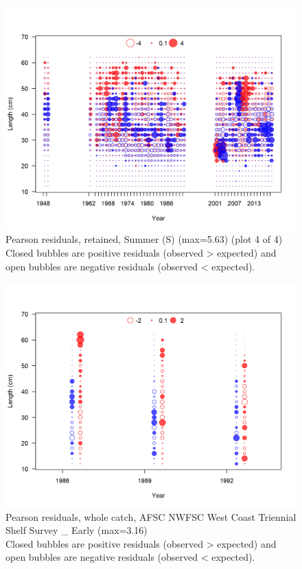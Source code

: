 \documentclass[12pt,]{article}
\begin{document}
\begin{figure}
\centering
\includegraphics{r4ss/plots_mod1/comp_lenfit_residsflt4mkt2_page4.png}
\caption{Pearson residuals, retained, Summer (S) (max=5.63) (plot 4 of
4)\\
Closed bubbles are positive residuals (observed \textgreater{} expected)
and open bubbles are negative residuals (observed \textless{} expected).
\label{fig:ss_len_pearson}}
\end{figure}

\begin{figure}
\centering
\includegraphics{r4ss/plots_mod1/comp_lenfit_residsflt5mkt0.png}
\caption{Pearson residuals, whole catch, AFSC NWFSC West Coast Triennial
Shelf Survey \_ Early (max=3.16)\\
Closed bubbles are positive residuals (observed \textgreater{} expected)
and open bubbles are negative residuals (observed \textless{} expected).
\label{fig:tri_len_pearson}}
\end{figure}
\end{document}
